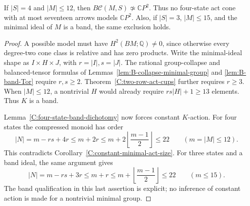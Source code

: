 \begin{corollary}
\label{C:four-state-cones-seventeen}
If $|S|=4$ and $|M|\leq12$, then
$B\mathcal C(M,S)\not\simeq\mathbb CP^2$.
Thus no four-state act cone with at most seventeen arrows
models $\mathbb CP^2$.  Also, if $|S|=3$, $|M|\leq15$, and
the minimal ideal of $M$ is a band, the same exclusion holds.
\end{corollary}
\begin{proof}
A possible model must have $H^2(BM;\mathbb Q)\ne0$, since
otherwise every degree-two cone class is relative and has zero
products.  Write the minimal-ideal shape as $I\times H\times J$,
with $r=|I|,s=|J|$.  The rational group-collapse and balanced-tensor
formulas of Lemmas~\ref{lem:B-collapse-minimal-group} and
\ref{lem:B-band-Tor} require $r,s\geq2$.
Theorem~\ref{C:two-row-act-cups} further requires $r\geq3$.
When $|M|\leq12$, a nontrivial $H$ would already require
$rs|H|+1\geq13$ elements.  Thus $K$ is a band.

Lemma~\ref{C:four-state-band-dichotomy} now forces constant
$K$-action.  For four states the compressed monoid has order
\[
 |N|=m-rs+4r\leq m+2r
 \leq m+2\left\lfloor\frac{m-1}{2}\right\rfloor\leq22
 \qquad(m=|M|\leq12).
\]
This contradicts Corollary~\ref{C:constant-minimal-act-size}.
For three states and a band ideal, the same argument gives
\[
 |N|=m-rs+3r\leq m+r
 \leq m+\left\lfloor\frac{m-1}{2}\right\rfloor\leq22
 \qquad(m\leq15).
\]
The band qualification in this last assertion is explicit;
no inference of constant action is made for a nontrivial
minimal group.
\end{proof}

